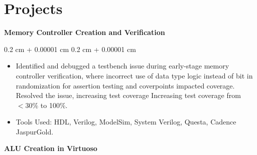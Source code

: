 \documentclass[10pt, letterpaper]{article}
\newenvironment{highlights}{
    \begin{itemize}[
        topsep=0.10 cm,
        parsep=0.10 cm,
        partopsep=0pt,
        itemsep=0pt,
        leftmargin=0.4 cm + 10pt
    ]
}{
    \end{itemize}
} %
\newenvironment{onecolentry}{
    \begin{adjustwidth}{
        0.2 cm + 0.00001 cm
    }{
        0.2 cm + 0.00001 cm
    }
}{
    \end{adjustwidth}
} %
\newenvironment{twocolentry}[2][]{
    \onecolentry
    \def\secondColumn{#2}
    \setcolumnwidth{\fill, 4.5 cm}
    \begin{paracol}{2}
}{
    \switchcolumn \raggedleft \secondColumn
    \end{paracol}
    \endonecolentry
} %
\let\hrefWithoutArrow\href
\renewcommand{\href}[2]{\hrefWithoutArrow{#1}{\ifthenelse{\equal{#2}{}}{ }{#2 }\raisebox{.15ex}{\footnotesize \faExternalLink*}}}
\begin{document}
        \vspace{0.2 cm}

    \section{Projects}

            \textbf{Memory Controller Creation and Verification}

        \vspace{0.10 cm}
        \begin{onecolentry}
            \begin{highlights}
                \item Identified and debugged a testbench issue during early-stage memory controller verification, where incorrect use of data type logic instead of bit in randomization for assertion testing and coverpoints impacted coverage. Resolved the issue, increasing test coverage Increasing test coverage from \( < 30\% \) to 100\%.
                \item Tools Used: HDL, Verilog, ModelSim, System Verilog, Questa, Cadence JaspurGold.
            \end{highlights}
        \end{onecolentry}




        
        \vspace{0.2 cm}

        \textbf{ALU Creation in Virtuoso}
\end{document}
